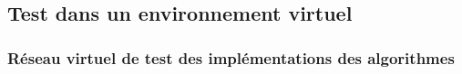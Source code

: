 \subsection{Test dans un environnement virtuel}
%

\subsubsection{Réseau virtuel de test des implémentations des algorithmes}

